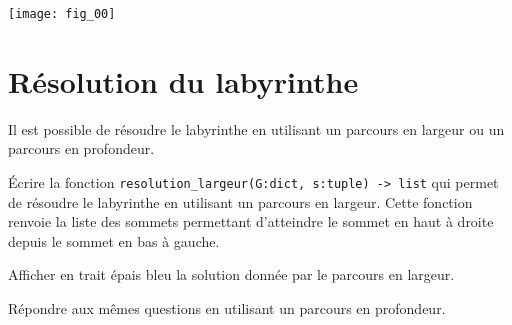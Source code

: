 \begin{marginfigure}
\texttt{[image: fig\_00]}
\end{marginfigure}



\section*{Résolution du labyrinthe}

Il est possible de résoudre le labyrinthe en utilisant un parcours en largeur ou un parcours en profondeur.

\begin{question} Écrire la fonction \lstinline{resolution_largeur(G:dict, s:tuple) -> list} qui permet de résoudre le labyrinthe en utilisant un parcours en largeur. Cette fonction renvoie la liste des sommets permettant d’atteindre le sommet en haut à droite depuis le sommet en bas à gauche.
\end{question}

\begin{question}
Afficher en trait épais bleu la solution donnée par le parcours en largeur.
\end{question}

\begin{question}
Répondre aux mêmes questions en utilisant un parcours en profondeur.
\end{question}


